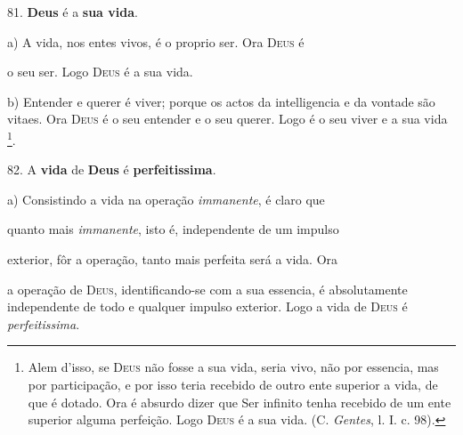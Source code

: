 81. \textbf{Deus} é a \textbf{sua vida}.

a) A vida, nos entes vivos, é o proprio ser. Ora \textsc{Deus} é

o seu ser. Logo \textsc{Deus} é a sua vida.

b) Entender e querer é viver; porque os actos da intelligencia e da vontade são vitaes. Ora \textsc{Deus} é o seu entender e o seu querer. Logo é o seu viver e a sua vida \footnote{Alem d'isso, se \textsc{Deus} não fosse a sua vida, seria vivo, não por essencia, mas por participação, e por isso teria recebido de outro ente superior a vida, de que é dotado. Ora é absurdo dizer que Ser infinito tenha recebido de um ente superior alguma perfeição. Logo \textsc{Deus} é a sua vida. (C. \emph{Gentes}, l. I. c. 98).}.

82. A \textbf{vida} de \textbf{Deus} é \textbf{perfeitissima}.

a) Consistindo a vida na operação \emph{immanente}, é claro que

quanto mais \emph{immanente}, isto é, independente de um impulso

exterior, fôr a operação, tanto mais perfeita será a vida. Ora

a operação de \textsc{Deus}, identificando-se com a sua essencia, é   absolutamente independente de todo e qualquer impulso exterior. Logo a vida de \textsc{Deus} é \emph{perfeitissima}.

